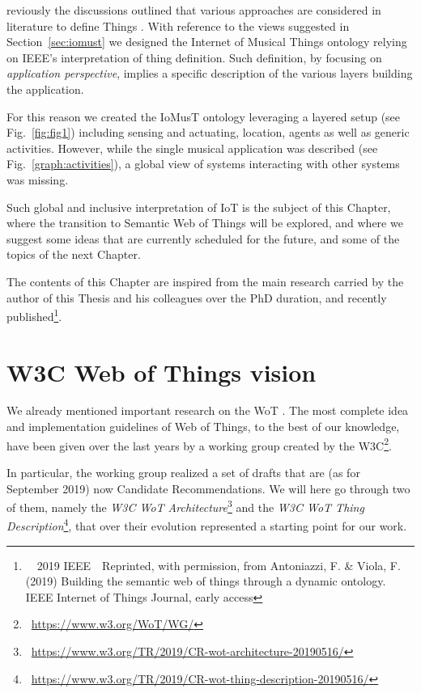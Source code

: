 reviously the discussions outlined that various approaches are considered in literature to define Things \cite{liu2016comparison}. With reference to the views suggested in Section~\ref{sec:iomust} we designed the Internet of Musical Things ontology relying on IEEE's interpretation of thing definition. Such definition, by focusing on \textit{application perspective}, implies a specific description of the various layers building the application. 

For this reason we created the IoMusT ontology leveraging a layered setup (see Fig.~\ref{fig:fig1}) including sensing and actuating, location, agents as well as generic activities. However, while the single musical application was described (see Fig.~\ref{graph:activities}), a global view of systems interacting with other systems was missing.

Such global and inclusive interpretation of IoT is the subject of this Chapter, where the transition to Semantic Web of Things will be explored, and where we suggest some ideas that are currently scheduled for the future, and some of the topics of the next Chapter.

The contents of this Chapter are inspired from the main research carried by the author of this Thesis and his colleagues over the PhD duration, and recently published\footnote{~\faCopyright~2019 IEEE~~Reprinted, with permission, from Antoniazzi, F. \& Viola, F. (2019) Building the semantic web
of things through a dynamic ontology. IEEE Internet of Things Journal, early access}.

\section{W3C Web of Things vision}
We already mentioned important research on the WoT \cite{guinard2011internet, zeng2011web, raggett2015web}. The most complete idea and implementation guidelines of Web of Things, to the best of our knowledge, have been given over the last years by a working group created by the W3C\footnote{\faLink~\url{https://www.w3.org/WoT/WG/}}.

In particular, the working group realized a set of drafts that are (as for September 2019) now Candidate Recommendations. We will here go through two of them, namely the \textit{W3C WoT Architecture}\footnote{\faLink~\url{https://www.w3.org/TR/2019/CR-wot-architecture-20190516/}} and the \textit{W3C WoT Thing Description}\footnote{\faLink~\url{https://www.w3.org/TR/2019/CR-wot-thing-description-20190516/}}, that over their evolution represented a starting point for our work.

